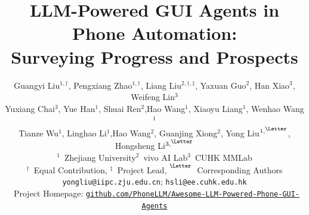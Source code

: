 \documentclass[10pt,journal, compsoc]{IEEEtran}
\begin{document}
\title{LLM-Powered GUI Agents in Phone Automation: \\Surveying Progress and Prospects} 



\author{Guangyi Liu$^{1,\dag}$, Pengxiang Zhao$^{1,\dag}$, Liang Liu$^{2,\dag,\ddag}$, Yaxuan Guo$^2$, Han Xiao$^{3}$, Weifeng Lin$^{3}$\\
Yuxiang Chai$^{3}$, Yue Han$^1$, Shuai Ren$^2$,Hao Wang$^1$, Xiaoyu Liang$^1$, Wenhao Wang$^1$\\
Tianze Wu$^1$, Linghao Li$^{1}$,Hao Wang$^2$, Guanjing Xiong$^2$, Yong Liu$^{1,\textsuperscript{\Letter}}$, Hongsheng Li$^{3,\textsuperscript{\Letter}}$  \\
\normalsize{$^1$~Zhejiang University\quad$^2$~vivo AI Lab\quad$^3$~CUHK MMLab} \\
\small{$^\dag$~Equal Contribution, \quad $^\ddag$~Project Lead, \quad $^{\textsuperscript{\Letter}}$~Corresponding Authors} \\
\texttt{\small yongliu@iipc.zju.edu.cn}; \texttt{\small hsli@ee.cuhk.edu.hk}\quad\\\
\small{Project Homepage: }\href{https://github.com/PhoneLLM/Awesome-LLM-Powered-Phone-GUI-Agents}{\texttt{\small github.com/PhoneLLM/Awesome-LLM-Powered-Phone-GUI-Agents}} 
}





\end{document}
